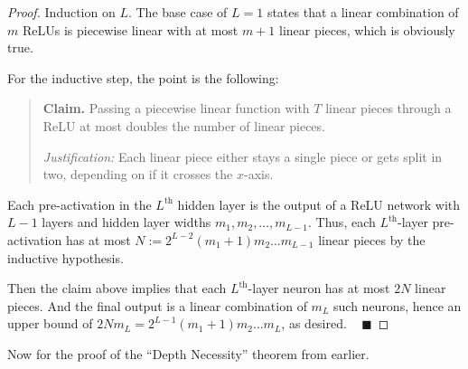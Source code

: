 \begin{proof}
    Induction on $L$.  The base case of $L = 1$ states that
    a linear combination of $m$ ReLUs
    is piecewise linear with at most $m + 1$
    linear pieces, which is obviously true.

    For the inductive step, the point is the following:
    \begin{quote}
        \textbf{Claim.}
        Passing a piecewise linear function
        with $T$ linear pieces through a ReLU
        at most doubles the number of linear pieces.

        \emph{Justification:}
        Each linear piece
        either stays a single piece
        or gets split in two,
        depending on if it crosses the $x$-axis.
    \end{quote}
    Each pre-activation in the $L^{\text{th}}$ hidden layer
    is the output of a ReLU network with $L - 1$ layers
    and hidden layer widths $m_1, m_2, \dots, m_{L - 1}$.
    Thus, each $L^{\text{th}}$-layer pre-activation
    has at most $N := 2^{L - 2}(m_1 + 1)m_2\dots m_{L - 1}$ linear pieces
    by the inductive hypothesis.

    Then the claim above implies
    that each $L^{\text{th}}$-layer neuron has at most $2N$
    linear pieces.
    And the final output is a linear combination of $m_L$ such neurons,
    hence an upper bound of
    $2Nm_L = 2^{L - 1}(m_1 + 1)m_2\dots m_L$, as desired. ~ $\blacksquare$
\end{proof}

Now for the proof of the ``Depth Necessity'' theorem from earlier.

